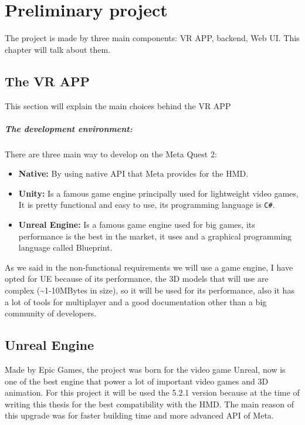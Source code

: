 
\chapter{Preliminary project}
\noindent
The project is made by three main components: \ac{VR} APP, backend, Web \ac{UI}. This chapter will talk about them.
\section{The VR APP}
\noindent
This section will explain the main choices behind the \ac{VR} APP
\paragraph{The development environment:} 
There are three main way to develop on the Meta Quest 2:

\begin{itemize}
  \item \textbf{Native:} By using native \ac{API} that Meta provides for the \ac{HMD}.
  \item \textbf{Unity:} Is a famous game engine principally used for lightweight video games, It is pretty functional and easy to use, its programming language is \verb|C#|. 
  \item \textbf{Unreal Engine:} Is a famous game engine used for big games, its performance is the best in the market, it uses \cpp and a graphical programming language called Blueprint. 
\end{itemize}
\noindent
As we said in the non-functional requirements we will use a game engine, I have opted for \ac{UE} because of its performance, the 3D models that will use are complex (\textasciitilde1-10MBytes in size),
so it will be used for its performance, also it has a lot of tools for multiplayer and a good documentation other than a big community of developers.

\section{Unreal Engine}
\noindent
Made by Epic Games, the project was born for the video game Unreal, now is one of the best engine that power a lot of important video games and 3D animation.
For this project it will be used the 5.2.1 version because at the time of writing this thesis for the best compatibility with the \ac{HMD}.
The main reason of this upgrade was for faster building time and more advanced \ac{API} of Meta.

